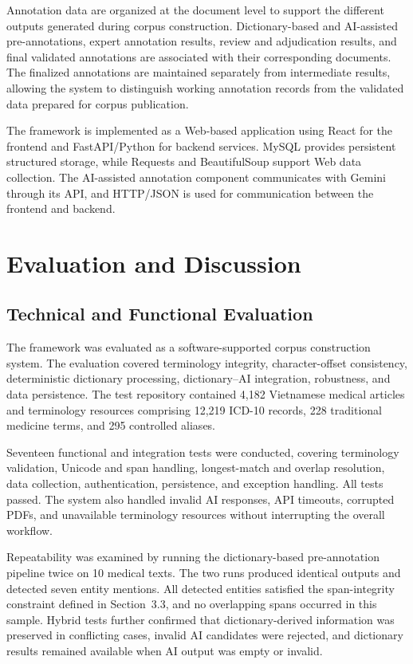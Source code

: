 \documentclass[runningheads]{llncs}
\begin{document}
Annotation data are organized at the document level to support the different outputs generated during corpus construction. Dictionary-based and AI-assisted pre-annotations, expert annotation results, review and adjudication results, and final validated annotations are associated with their corresponding documents. The finalized annotations are maintained separately from intermediate results, allowing the system to distinguish working annotation records from the validated data prepared for corpus publication.

The framework is implemented as a Web-based application using React for the frontend and FastAPI/Python for backend services. MySQL provides persistent structured storage, while Requests and BeautifulSoup support Web data collection. The AI-assisted annotation component communicates with Gemini through its API, and HTTP/JSON is used for communication between the frontend and backend.

\section{Evaluation and Discussion}
\subsection{Technical and Functional Evaluation}
The framework was evaluated as a software-supported corpus construction system. The evaluation covered terminology integrity, character-offset consistency, deterministic dictionary processing, dictionary--AI integration, robustness, and data persistence. The test repository contained 4,182 Vietnamese medical articles and terminology resources comprising 12,219 ICD-10 records, 228 traditional medicine terms, and 295 controlled aliases.

Seventeen functional and integration tests were conducted, covering terminology validation, Unicode and span handling, longest-match and overlap resolution, data collection, authentication, persistence, and exception handling. All tests passed. The system also handled invalid AI responses, API timeouts, corrupted PDFs, and unavailable terminology resources without interrupting the overall workflow.

Repeatability was examined by running the dictionary-based pre-annotation pipeline twice on 10 medical texts. The two runs produced identical outputs and detected seven entity mentions. All detected entities satisfied the span-integrity constraint defined in Section~3.3, and no overlapping spans occurred in this sample. Hybrid tests further confirmed that dictionary-derived information was preserved in conflicting cases, invalid AI candidates were rejected, and dictionary results remained available when AI output was empty or invalid.
\end{document}
